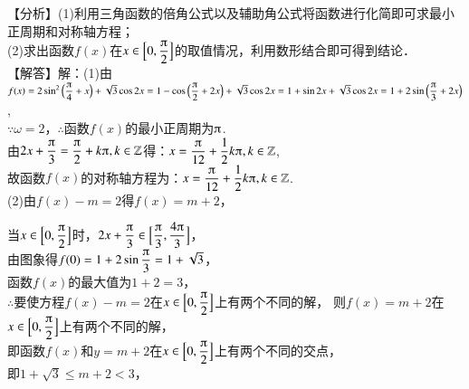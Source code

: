 \begin{exercise}
\begin{answer}
        【分析】(1)利用三角函数的倍角公式以及辅助角公式将函数进行化简即可求最小正周期和对称轴方程；\\
        (2)求出函数$f(x)$在$x\in\Bigl[0,\dfrac{\piup}2\Bigr]$的取值情况，利用数形结合即可得到结论．\\
        【解答】解：(1)由$f(x)=2\sin^2{\Bigl(\dfrac{\piup}4+x\Bigr)}+\sqrt3\cos{2x}
        =1-\cos{\Bigl(\dfrac{\piup}2+2x\Bigr)}+\sqrt3\cos{2x}
        =1+\sin{2x}+\sqrt3\cos{2x}=1+2\sin{\Bigl(\dfrac{\piup}3+2x\Bigr)}$,\\
        $\because \omega=2$，$\therefore$函数$f(x)$的最小正周期为$\piup$.\\
        由$2x+\dfrac{\piup}3=\dfrac{\piup}2+k\piup,k\in\mathbb{Z}$得：$x=\dfrac{\piup}{12}+\dfrac12k\piup,{k\in\mathbb{Z}}$,\\
        故函数$f(x)$的对称轴方程为：$x=\dfrac{\piup}{12}+\dfrac12k\piup,{k\in\mathbb{Z}}$.\\
        (2)由$f(x)-m=2$得$f(x)=m+2$，\\
        当${x\in\Bigl[0,\dfrac{\piup}2\Bigr]}$时，$2x+\dfrac{\piup}3\in\Bigl[\dfrac{\piup}3,\dfrac{4\piup}3\Bigr]$，\\
        由图象得$f(0)=1+2\sin{\dfrac{\piup}3}=1+\sqrt3$，\\
        函数$f(x)$的最大值为$1+2=3$，\\
        $\therefore$要使方程$f(x)-m=2$在$x\in\Bigl[0,\dfrac{\piup}2\Bigr]$上有两个不同的解，
        则$f(x)=m+2$在$x\in\Bigl[0,\dfrac{\piup}2\Bigr]$上有两个不同的解，\\
        即函数$f(x)$和$y=m+2$在$x\in\Bigl[0,\dfrac{\piup}2\Bigr]$上有两个不同的交点，\\
        即$1+\sqrt3\leqslant m+2<3$，\\

\end{answer}
\end{exercise}
